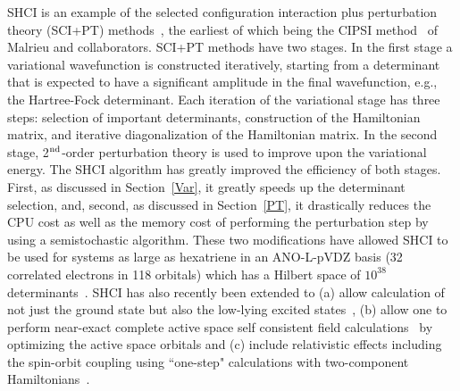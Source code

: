 \documentclass[%
reprint,
 superscriptaddress,
 amsmath,amssymb,
 aps,
]{revtex4-1}
\begin{document}
SHCI is an example of the selected configuration interaction plus perturbation theory (SCI+PT)
methods~\cite{HurMalRan-JCP-73,BuePey-TCA-74,EvaDauMal-CP-83,CimPer-JCoP-87,Har-JCP-91,BytRue-CP-09,Eva-JCP-14,SceAppGinCaf-JCoC-16,GarSceLooCaf-JCP-17,TubLevHaiHeaWha-ARX-18},
the earliest of which being
the CIPSI method~\cite{HurMalRan-JCP-73,EvaDauMal-CP-83} of Malrieu and collaborators.
SCI+PT methods have two stages.  In the first stage a variational wavefunction is constructed iteratively, starting from
a determinant that is expected to have a significant amplitude in the final wavefunction, e.g., the Hartree-Fock determinant.
Each iteration of the variational stage has three steps: selection of important determinants, construction of the Hamiltonian matrix, and
iterative diagonalization of the Hamiltonian matrix.
In the second stage, 2$^{\rm nd}$-order perturbation theory is used to improve upon the variational energy.
The SHCI algorithm has greatly improved the efficiency of both stages.
First, as discussed in Section~\ref{Var}, it greatly speeds up the determinant selection, and, second, as discussed in
Section~\ref{PT}, it drastically reduces the CPU cost as well as the memory cost of performing the perturbation step by using a semistochastic algorithm.
These two modifications have allowed SHCI to be used for systems as large as hexatriene
in an ANO-L-pVDZ basis (32 correlated electrons in 118 orbitals) which has a Hilbert space of $10^{38}$ determinants~\cite{ChiHolOttUmrShaZim-JPCA-18}.
SHCI has also recently been extended to (a) allow calculation of not just the ground state but also the low-lying excited states~\cite{HolUmrSha-JCP-17}, 
(b) allow one to perform near-exact complete active space self consistent field calculations~\cite{SmiMusHolSha-JCTC-17} by optimizing the active space orbitals and (c) include relativistic effects including the spin-orbit coupling using ``one-step" calculations with two-component Hamiltonians~\cite{MusSha-JCTC-17}.
\end{document}
